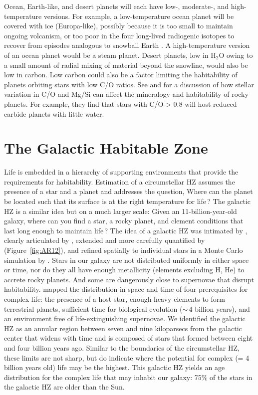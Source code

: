 Ocean, Earth-like, and desert planets will each have low-, moderate-, and high-temperature versions. For example, a low-temperature ocean planet will be covered with ice (Europa-like), possibly because it is too small to maintain ongoing volcanism, or too poor in the four long-lived radiogenic isotopes to recover from episodes analogous to snowball Earth \citep{Hoffman2002}. A high-temperature version of an ocean planet would be a steam planet. Desert planets, low in H$_{2}$O owing to a small amount of radial mixing of material beyond the snowline, would also be low in carbon. Low carbon could also be a factor limiting the habitability of planets orbiting stars with low C/O ratios. See \citet{Bond2010} and \citet{Delgado-Mena2010} for a discussion of how stellar variation in C/O and Mg/Si can affect the mineralogy and habitability of rocky planets. For example, they find that stars with C/O > 0.8 will host reduced carbide planets with little water.

\clearpage
\section{The Galactic Habitable Zone}\label{sec:GHZ}

Life is embedded in a hierarchy of supporting environments that provide the requirements for habitability. Estimation of a circumstellar HZ assumes the presence of a star and a planet and addresses the question, Where can the planet be located such that its surface is at the right temperature for life\,? The galactic HZ is a similar idea but on a much larger scale: Given an 11-billion-year-old galaxy, where can you find a star, a rocky planet, and clement conditions that last long enough to maintain life\,? The idea of a galactic HZ was intimated by  \citet{Lem1986}, clearly articulated by \citet{Gonzalez2001}, extended and more carefully quantified by \cite{Lineweaver2004} (Figure~\ref{fig:AR12}), and refined spatially to individual stars in a Monte Carlo simulation by \citet{Gowanlock2011} \citep[see however,][]{Prantzos2008}. Stars in our galaxy are not distributed uniformly in either space or time, nor do they all have enough metallicity (elements excluding H, He) to accrete rocky planets. And some are dangerously close to supernovae that disrupt habitability. \citet{Lineweaver2004} mapped the distribution in space and time of four prerequisites for complex life: the presence of a host star, enough heavy elements to form terrestrial planets, sufficient time for biological evolution ($\sim$\,4 billion years), and an environment free of life-extinguishing supernovae. We identified the galactic HZ as an annular region between seven and nine kiloparsecs from the galactic center that widens with time and is composed of stars that formed between eight and four billion years ago. Similar to the boundaries of the circumstellar HZ, these limits are not sharp, but do indicate where the potential for complex (= 4 billion years old) life may be the highest. This galactic HZ yields an age distribution for the complex life that may inhabit our galaxy: 75\% of the stars in the galactic HZ are older than the Sun.

